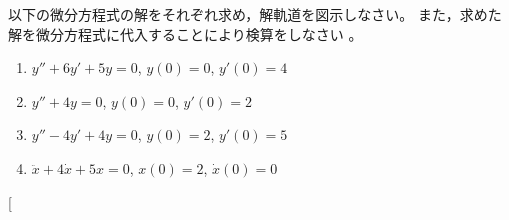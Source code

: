 \documentclass[twocolumn,11pt]{jarticle}
\begin{document}
\exercise
以下の微分方程式の解をそれぞれ求め，解軌道を図示しなさい。
また，求めた解を微分方程式に代入することにより検算をしなさい
。
\begin{enumerate}
\item $y''+6y'+5y=0$, $y(0)=0$, $y'(0)=4$
\item $y''+4y=0$, $y(0)=0$, $y'(0)=2$
\item $y''-4y'+4y=0$, \;$y(0)=2$, \;$y'(0)=5$
\item $\ddot{x}+4\dot{x}+5x=0$, $x(0)=2$, $\dot{x}(0)=0$
\end{enumerate}

\newpage
\appendix
\twocolumn[
\end{document}
